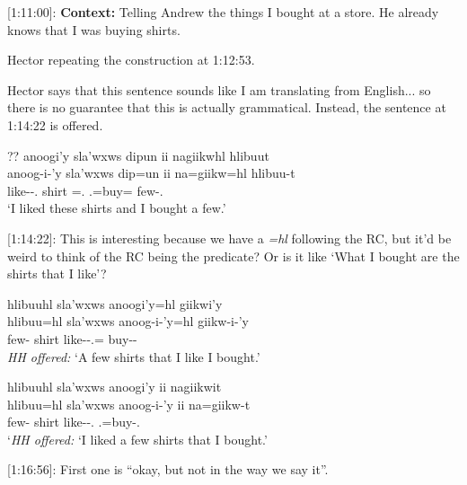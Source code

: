 [1:11:00]: \textbf{Context:} Telling Andrew the things I bought at a store. He already knows that I was buying shirts.

Hector repeating the construction at 1:12:53.

Hector says that this sentence sounds like I am translating from English... so there is no guarantee that this is actually grammatical. Instead, the sentence at 1:14:22 is offered.

\begin{exe}
    \ex \glll ?? anoogi'y sla'wxws dipun ii nagiikwhl hlibuut \\
    {} anoog-i-'y sla'wxws dip=un ii na=giikw=hl hlibuu-t  \\
    {} like-\Tr{}-\Fsg{}.\Ii{} shirt \Assoc{}=\Dem{}.\Prox{} \Ccnj{} \Fsg{}.\I{}=buy=\Cn{} few-\Tsg{}.\Ii{} \\
    `I liked these shirts and I bought a few.'
\end{exe}

[1:14:22]: This is interesting because we have a \textit{=hl} following the RC, but it'd be weird to think of the RC being the predicate? Or is it like `What I bought are the shirts that I like'?

\begin{exe}
    \ex 
    \begin{xlist}
    \item     \glll hlibuuhl sla'wxws anoogi'y=hl giikwi'y \\
    hlibuu=hl sla'wxws anoog-i-'y=hl giikw-i-'y \\
    few-\Cn{} shirt like-\Tr{}-\Fsg{}.\Ii{}=\Cn{} buy-\Tr{}-\Fsg{} \\
    \textit{HH offered: }`A few shirts that I like I bought.'

    \item     \glll hlibuuhl sla'wxws anoogi'y ii nagiikwit \\
    hlibuu=hl sla'wxws anoog-i-'y ii na=giikw-t  \\
    few-\Cn{} shirt like-\Tr{}-\Fsg{}.\Ii{}  \Ccnj{} \Fsg{}.\I{}=buy-\Tsg{}.\Ii{} \\
    `\textit{HH offered: }`I liked a few shirts that I bought.'
    \end{xlist}
\end{exe}

[1:16:56]: First one is ``okay, but not in the way we say it''.

